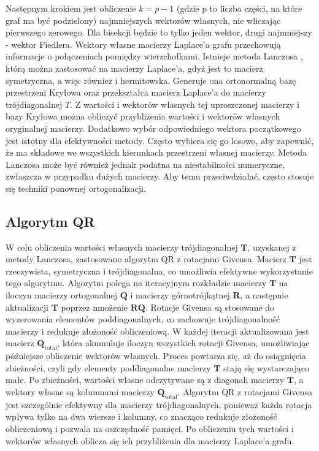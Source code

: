 \documentclass{article}
\begin{document}
    Następnym krokiem jest obliczenie \(k = p - 1\) (gdzie p to liczba części, na które graf ma być podzielony) najmniejszych wektorów własnych, nie wliczając pierwszego zerowego. Dla bisekcji będzie to tylko jeden wektor, drugi najmniejszy - wektor Fiedlera. Wektory własne macierzy Laplace'a grafu przechowują informacje o połączeniach pomiędzy wierzchołkami. 
    Istnieje metoda Lanczosa \cite{lanczos}, którą można zastosować na macierzy Laplace'a, gdyż jest to macierz symetryczna, a więc również i hermitowska. Generuje ona ortonormalną bazę przestrzeni Kryłowa oraz przekształca macierz Laplace'a do macierzy trójdiagonalnej \(T\). Z wartości i wektorów własnych tej uproszczonej macierzy i bazy Kryłowa można obliczyć przybliżenia wartości i wektorów własnych oryginalnej macierzy. Dodatkowo wybór odpowiedniego wektora początkowego jest istotny dla efektywności metody. Często wybiera się go losowo, aby zapewnić, że ma składowe we wszystkich kierunkach przestrzeni własnej macierzy. Metoda Lanczosa może być również jednak podatna na niestabilności numeryczne, zwłaszcza w przypadku dużych macierzy. Aby temu przeciwdziałać, często stosuje się techniki ponownej ortogonalizacji. 


    \subsection{Algorytm QR}
    W celu obliczenia wartości własnych macierzy trójdiagonalnej \( \mathbf{T} \), uzyskanej z metody Lanczosa, zastosowano algorytm QR z rotacjami Givensa. Macierz \( \mathbf{T} \) jest rzeczywista, symetryczna i trójdiagonalna, co umożliwia efektywne wykorzystanie tego algorytmu.
    Algorytm polega na iteracyjnym rozkładzie macierzy \( \mathbf{T} \) na iloczyn macierzy ortogonalnej \( \mathbf{Q} \) i macierzy górnotrójkątnej \( \mathbf{R} \), a następnie aktualizacji \( \mathbf{T} \) poprzez mnożenie \( \mathbf{R} \mathbf{Q} \). Rotacje Givensa są stosowane do wyzerowania elementów poddiagonalnych, co zachowuje trójdiagonalność macierzy i redukuje złożoność obliczeniową.
    W każdej iteracji aktualizowana jest macierz \( \mathbf{Q}_{\text{total}} \), która akumuluje iloczyn wszystkich rotacji Givensa, umożliwiając późniejsze obliczenie wektorów własnych. Proces powtarza się, aż do osiągnięcia zbieżności, czyli gdy elementy poddiagonalne macierzy \( \mathbf{T} \) stają się wystarczająco małe. Po zbieżności, wartości własne odczytywane są z diagonali macierzy \( \mathbf{T} \), a wektory własne są kolumnami macierzy \( \mathbf{Q}_{\text{total}} \).
    Algorytm QR z rotacjami Givensa jest szczególnie efektywny dla macierzy trójdiagonalnych, ponieważ każda rotacja wpływa tylko na dwa wiersze i kolumny, co znacząco redukuje złożoność obliczeniową i pozwala na oszczędność pamięci. Po obliczeniu tych wartości i wektorów własnych oblicza się ich przybliżenia dla macierzy Laplace'a grafu.
\end{document}
